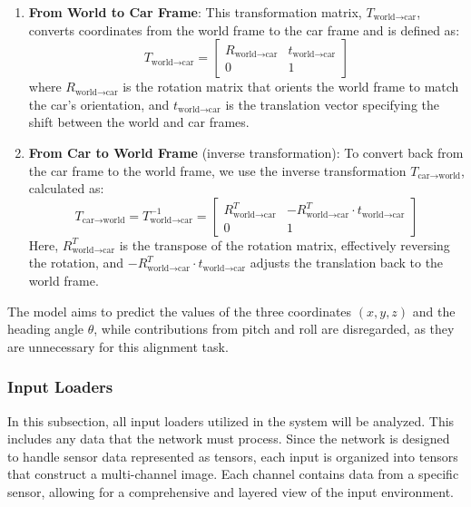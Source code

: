 \begin{enumerate}
    \item \textbf{From World to Car Frame}: This transformation matrix, \( T_{\text{world} \to \text{car}} \), converts coordinates from the world frame to the car frame and is defined as:
    \begin{equation}
        T_{\text{world} \to \text{car}} = \begin{bmatrix} R_{\text{world} \to \text{car}} & t_{\text{world} \to \text{car}} \\ 0 & 1 \end{bmatrix}
    \end{equation}
    where \( R_{\text{world} \to \text{car}} \) is the rotation matrix that orients the world frame to match the car's orientation, and \( t_{\text{world} \to \text{car}} \) is the translation vector specifying the shift between the world and car frames.

    \item \textbf{From Car to World Frame} (inverse transformation): To convert back from the car frame to the world frame, we use the inverse transformation \( T_{\text{car} \to \text{world}} \), calculated as:
    \begin{equation}
        T_{\text{car} \to \text{world}} = T_{\text{world} \to \text{car}}^{-1} = \begin{bmatrix} R_{\text{world} \to \text{car}}^T & -R_{\text{world} \to \text{car}}^T \cdot t_{\text{world} \to \text{car}} \\ 0 & 1 \end{bmatrix}
    \end{equation}
    Here, \( R_{\text{world} \to \text{car}}^T \) is the transpose of the rotation matrix, effectively reversing the rotation, and \( -R_{\text{world} \to \text{car}}^T \cdot t_{\text{world} \to \text{car}} \) adjusts the translation back to the world frame.
    
\end{enumerate}

The model aims to predict the values of the three coordinates \( (x, y, z) \) and the heading angle \( \theta \), while contributions from pitch and roll are disregarded, as they are unnecessary for this alignment task.

\subsubsection*{Input Loaders}
In this subsection, all input loaders utilized in the system will be analyzed. This includes any data that the network must process. Since the network is designed to handle sensor data represented as tensors, each input is organized into tensors that construct a multi-channel image. Each channel contains data from a specific sensor, allowing for a comprehensive and layered view of the input environment.

